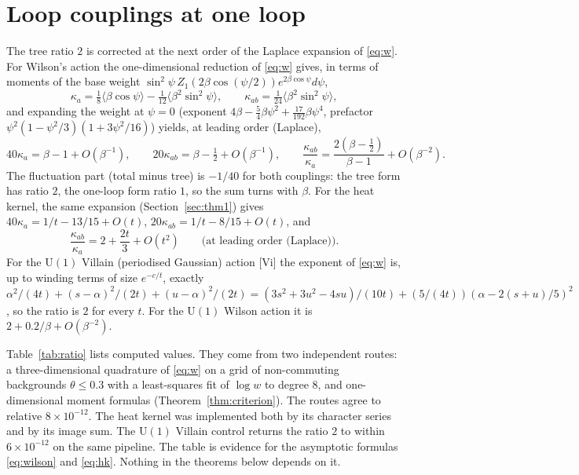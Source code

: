 \documentclass[11pt,a4paper]{article}
\theoremstyle{definition}
\theoremstyle{remark}
\begin{document}
\section{Loop couplings at one loop}\label{sec:oneloop}

The tree ratio $2$ is corrected at the next order of the Laplace expansion of \eqref{eq:w}.
For Wilson's action the one-dimensional reduction of \eqref{eq:w} gives, in terms of moments of the base weight $\sin^2\psi\,Z_1(2\beta\cos(\psi/2))e^{2\beta\cos\psi}d\psi$,
\[
\kappa_a=\tfrac18\langle\beta\cos\psi\rangle-\tfrac1{12}\langle\beta^2\sin^2\psi\rangle,\qquad \kappa_{ab}=\tfrac1{24}\langle\beta^2\sin^2\psi\rangle ,
\]
and expanding the weight at $\psi=0$ (exponent $4\beta-\tfrac54\beta\psi^2+\tfrac{17}{192}\beta\psi^4$, prefactor $\psi^2(1-\psi^2/3)(1+3\psi^2/16)$) yields, at leading order (Laplace),
\begin{equation}\label{eq:wilson}
40\kappa_a=\beta-1+O(\beta^{-1}),\qquad 20\kappa_{ab}=\beta-\tfrac12+O(\beta^{-1}),\qquad \frac{\kappa_{ab}}{\kappa_a}=\frac{2(\beta-\frac12)}{\beta-1}+O(\beta^{-2}).
\end{equation}
The fluctuation part (total minus tree) is $-1/40$ for both couplings: the tree form has ratio $2$, the one-loop form ratio $1$, so the sum turns with $\beta$.
For the heat kernel, the same expansion (Section~\ref{sec:thm1}) gives $40\kappa_a=1/t-13/15+O(t)$, $20\kappa_{ab}=1/t-8/15+O(t)$, and
\begin{equation}\label{eq:hk}
\frac{\kappa_{ab}}{\kappa_a}=2+\frac{2t}{3}+O(t^2)\qquad\text{(at leading order (Laplace))}.
\end{equation}
For the $\mathrm{U}(1)$ Villain (periodised Gaussian) action [Vi] the exponent of \eqref{eq:w} is, up to winding terms of size $e^{-c/t}$, exactly
$\alpha^2/(4t)+(s-\alpha)^2/(2t)+(u-\alpha)^2/(2t)=(3s^2+3u^2-4su)/(10t)+(5/(4t))(\alpha-2(s+u)/5)^2$,
so the ratio is $2$ for every $t$.
For the $\mathrm{U}(1)$ Wilson action it is $2+0.2/\beta+O(\beta^{-2})$.

Table~\ref{tab:ratio} lists computed values.
They come from two independent routes: a three-dimensional quadrature of \eqref{eq:w} on a grid of non-commuting backgrounds $\theta\le0.3$ with a least-squares fit of $\log w$ to degree $8$, and one-dimensional moment formulas (Theorem~\ref{thm:criterion}).
The routes agree to relative $8\times10^{-12}$.
The heat kernel was implemented both by its character series and by its image sum.
The $\mathrm{U}(1)$ Villain control returns the ratio $2$ to within $6\times10^{-12}$ on the same pipeline.
The table is evidence for the asymptotic formulas \eqref{eq:wilson} and \eqref{eq:hk}.
Nothing in the theorems below depends on it.
\end{document}
